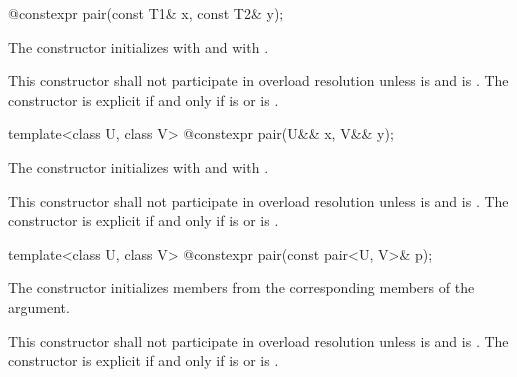 \begin{itemdecl}
@\EXPLICIT@ constexpr pair(const T1& x, const T2& y);
\end{itemdecl}

\begin{itemdescr}
\pnum
\effects
The constructor initializes  with  and 
with .
\end{itemdescr}

\pnum
\remarks This constructor shall not participate in overload resolution
unless  is  and
 is .
The constructor is explicit if and only if
 is  or
 is .

\begin{itemdecl}
template<class U, class V> @\EXPLICIT@ constexpr pair(U&& x, V&& y);
\end{itemdecl}

\begin{itemdescr}
\pnum
\effects
The constructor initializes  with
 and 
with .

\pnum
\remarks
This constructor shall not participate in overload resolution unless
 is  and
 is .
The constructor is explicit if and only if
 is  or
 is .
\end{itemdescr}

\begin{itemdecl}
template<class U, class V> @\EXPLICIT@ constexpr pair(const pair<U, V>& p);
\end{itemdecl}

\begin{itemdescr}
\pnum
\effects
The constructor initializes members from the corresponding members of the argument.

\pnum
\remarks This constructor shall not participate in overload resolution unless
 is  and
 is .
The constructor is explicit if and only if
 is  or
 is .
\end{itemdescr}

